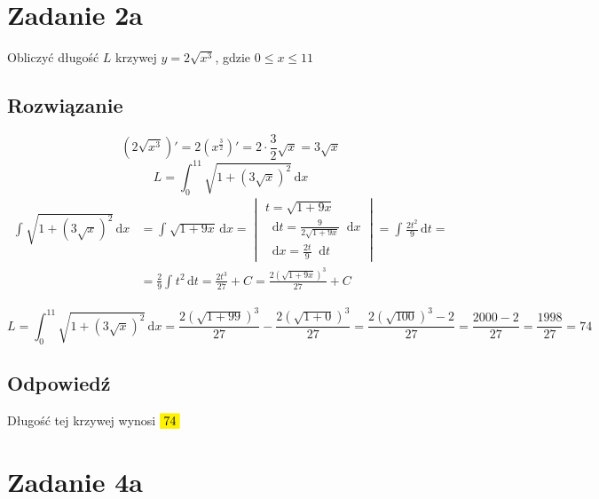 \documentclass[12pt]{article}
\newcommand*\diff{\mathop{}\!\mathrm{d}}
\newcommand{\Integral}[4]{\int_{#1}^{#2} \! #3 \, \mathrm{d}#4}
\newcommand{\mathcolorbox}[2]{\colorbox{#1}{$\displaystyle #2$}}
\DeclareMathOperator{\?}{?}
\begin{document}
\section{Zadanie 2a}

Obliczyć długość $L$ krzywej $ y = 2\sqrt{x^3} $, gdzie $ 0 \le x \le 11 $

\subsection*{Rozwiązanie}

\begin{equation*}
    (2\sqrt{x^3})' = 2(x^{\frac{3}{2}})' = 2 \cdot \frac{3}{2} \sqrt{x} = 3\sqrt{x}
\end{equation*}
\begin{equation*}
    L = \Integral{0}{11}{ \sqrt{1 + \left(3\sqrt{x} \right)^2 } }{x}
\end{equation*}
\begin{align*}
    \Integral{}{}{ \sqrt{1 + \left(3\sqrt{x} \right)^2 } }{x}
    &= \Integral{}{}{ \sqrt{1 + 9x } }{x} =
    \begin{vmatrix}
        \displaystyle t       = \sqrt{1 + 9x} \\[0.5em]
        \displaystyle \diff t = \frac{9}{2\sqrt{1+9x}} \diff x \\[1em]
        \displaystyle \diff x = \frac{2t}{9} \diff t
    \end{vmatrix}
    = \Integral{}{}{\frac{2 t^2}{9}}{t} =\\
    &= \frac{2}{9} \Integral{}{}{t^2}{t} =
    \frac{2t^3}{27} + C = \frac{2\left( \sqrt{1 + 9x} \right)^3}{27} + C
\end{align*}

\begin{equation*}
    L = \Integral{0}{11}{ \sqrt{1 + \left(3\sqrt{x} \right)^2 } }{x} =
    \frac{2\left( \sqrt{1 + 99} \right)^3}{27} - \frac{2\left( \sqrt{1 + 0} \right)^3}{27} =
    \frac{2 \left(\sqrt{100}\right)^3 - 2}{27} = \frac{2000 - 2}{27} = \frac{1998}{27} = 74
\end{equation*}

\subsection*{Odpowiedź}
Długość tej krzywej wynosi $\mathcolorbox{yellow}{74}$

\section{Zadanie 4a}
\end{document}

